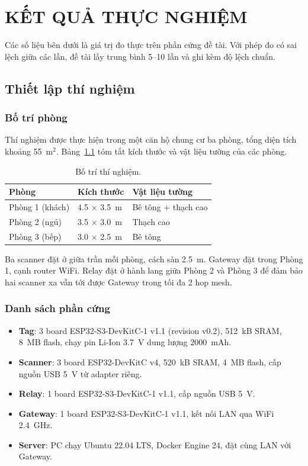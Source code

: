 \chapter{KẾT QUẢ THỰC NGHIỆM}
\label{Chapter5}

Các số liệu bên dưới là giá trị đo thực trên phần cứng đề tài. Với phép đo có sai lệch giữa các lần, đề tài lấy trung bình 5--10 lần và ghi kèm độ lệch chuẩn.

\section{Thiết lập thí nghiệm}

\subsection{Bố trí phòng}

Thí nghiệm được thực hiện trong một căn hộ chung cư ba phòng, tổng diện tích khoảng 55~m$^2$. Bảng~\ref{tab:layout} tóm tắt kích thước và vật liệu tường của các phòng.

\begin{table}[htp]
    \centering
    \caption{Bố trí thí nghiệm.}
    \label{tab:layout}
    \begin{tabular}{lll}
        \hline
        \textbf{Phòng} & \textbf{Kích thước} & \textbf{Vật liệu tường} \\
        \hline
        Phòng 1 (khách) & 4.5 $\times$ 3.5~m & Bê tông + thạch cao \\
        Phòng 2 (ngủ)   & 3.5 $\times$ 3.0~m & Thạch cao \\
        Phòng 3 (bếp)   & 3.0 $\times$ 2.5~m & Bê tông \\
        \hline
    \end{tabular}
\end{table}

Ba scanner đặt ở giữa trần mỗi phòng, cách sàn 2.5~m. Gateway đặt trong Phòng 1, cạnh router WiFi. Relay đặt ở hành lang giữa Phòng 2 và Phòng 3 để đảm bảo hai scanner xa vẫn tới được Gateway trong tối đa 2 hop mesh.

\subsection{Danh sách phần cứng}

\begin{itemize}
    \item \textbf{Tag}: 3 board ESP32-S3-DevKitC-1 v1.1 (revision v0.2), 512~kB SRAM, 8~MB flash, chạy pin Li-Ion 3.7~V dung lượng 2000~mAh.
    \item \textbf{Scanner}: 3 board ESP32-DevKitC v4, 520~kB SRAM, 4~MB flash, cấp nguồn USB 5~V từ adapter riêng.
    \item \textbf{Relay}: 1 board ESP32-S3-DevKitC-1 v1.1, cấp nguồn USB 5~V.
    \item \textbf{Gateway}: 1 board ESP32-S3-DevKitC-1 v1.1, kết nối LAN qua WiFi 2.4~GHz.
    \item \textbf{Server}: PC chạy Ubuntu 22.04 LTS, Docker Engine 24, đặt cùng LAN với Gateway.
\end{itemize}


